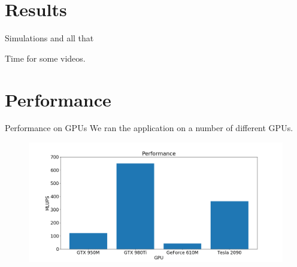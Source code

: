 \documentclass[9pt]{beamer}
\begin{document}
\section{Results}
\begin{frame}{Simulations and all that}

\centering 
\huge Time for some videos.

\end{frame}

\section{Performance}

\begin{frame}{Performance on GPUs}
We ran the application on a number of different GPUs. 

\begin{figure}
\begin{center}
	\includegraphics[scale=0.25]{images/performance_on_different_gpus.png}
\end{center}
\end{figure}

\end{frame}


\end{document}
